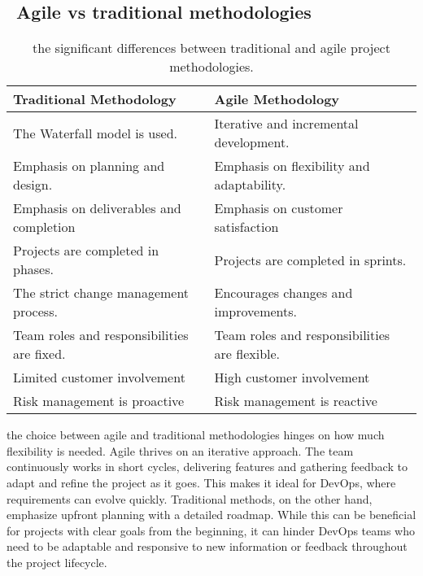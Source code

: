 \subsection*{ \textbullet\ Agile vs traditional methodologies}
\begin{longtable}[c]{
    |p{}
    |p{}|
    }
    \caption{the significant differences between traditional and agile project methodologies. \cite{webArticle1}}
    \label{tab:traditional_vs_agile}                                                           \\
    \hline
    \textbf{ Traditional Methodology }         & \textbf{ Agile Methodology }                  \\
    \hline
    The Waterfall model is used.               & Iterative and incremental development.        \\
    \hline
    Emphasis on planning and design.           & Emphasis on flexibility and adaptability.     \\
    \hline
    Emphasis on deliverables and completion    & Emphasis on customer satisfaction             \\
    \hline
    Projects are completed in phases.          & Projects are completed in sprints.            \\
    \hline
    The strict change management process.      & Encourages changes and improvements.          \\
    \hline
    Team roles and responsibilities are fixed. & Team roles and responsibilities are flexible. \\
    \hline
    Limited customer involvement               & High customer involvement                     \\
    \hline
    Risk management is proactive               & Risk management is reactive                   \\
    \hline
\end{longtable}
the choice between agile and traditional methodologies hinges on how much flexibility is needed. Agile thrives on an iterative approach. The team continuously works in short cycles, delivering features and gathering feedback to adapt and refine the project as it goes. This makes it ideal for DevOps, where requirements can evolve quickly. Traditional methods, on the other hand, emphasize upfront planning with a detailed roadmap. While this can be beneficial for projects with clear goals from the beginning, it can hinder DevOps teams who need to be adaptable and responsive to new information or feedback throughout the project lifecycle.
